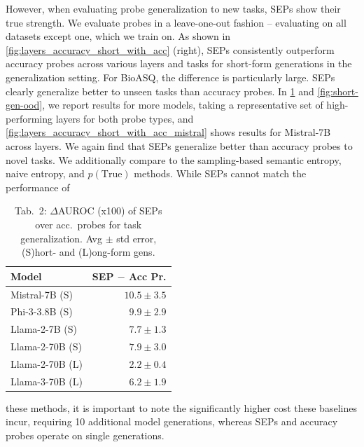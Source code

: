 \documentclass{article}
\begin{document}
However, when evaluating probe generalization to new tasks, SEPs show their true strength. 
We evaluate probes in a leave-one-out fashion -- evaluating on all datasets except one, which we train on.
As shown in \cref{fig:layers_accuracy_short_with_acc} (right), SEPs consistently outperform accuracy probes across various layers and tasks for short-form generations in the generalization setting.
For BioASQ, the difference is particularly large.
SEPs clearly generalize better to unseen tasks than accuracy probes.
In \cref{tab:out_of_distriution_short_and_long_gen} and \cref{fig:short-gen-ood}, we report results for more models, taking a representative set of high-performing layers for both probe types, and \cref{fig:layers_accuracy_short_with_acc_mistral} shows results for Mistral-7B across layers.
We again find that SEPs generalize better than accuracy probes to novel tasks.
We additionally compare to the sampling-based semantic entropy, naive entropy, and $p(\text{True})$ methods.
While SEPs cannot match the performance of 




\begin{table}
\vspace{-13.5pt}
        \captionsetup{labelformat=empty}
        \setlength{\tabcolsep}{-2pt} %
        \caption{Tab.~2: $\Delta$AUROC (x100) of SEPs over acc.~probes for task generalization. Avg $\pm$ std error, (S)hort- and (L)ong-form gens.
        }
        \vspace{-5pt}
        \label{tab:out_of_distriution_short_and_long_gen}
        \begin{tabular}{lr}
        \toprule
        Model & SEP $-$ Acc Pr.\\
        \midrule
        Mistral-7B  {\tiny (S)}& $10.5 \pm 3.5$ \\
        Phi-3-3.8B  {\tiny (S)}& $9.9 \pm 2.9$ \\
        Llama-2-7B  {\tiny (S)}& $7.7 \pm 1.3$ \\
        Llama-2-70B {\tiny (S)} & $7.9 \pm 3.0$ \\
        Llama-2-70B {\tiny (L)} & $2.2  \pm 0.4$ \\
        Llama-3-70B {\tiny (L)} & $6.2 \pm 1.9$ \\
        \bottomrule
        \end{tabular}
        \setlength{\tabcolsep}{6pt}
        \vspace{-55pt}
\end{table}
these methods, it is important to note the significantly higher cost these baselines incur, requiring \num{10} additional model generations, whereas SEPs and accuracy probes operate on single generations.
\end{document}
